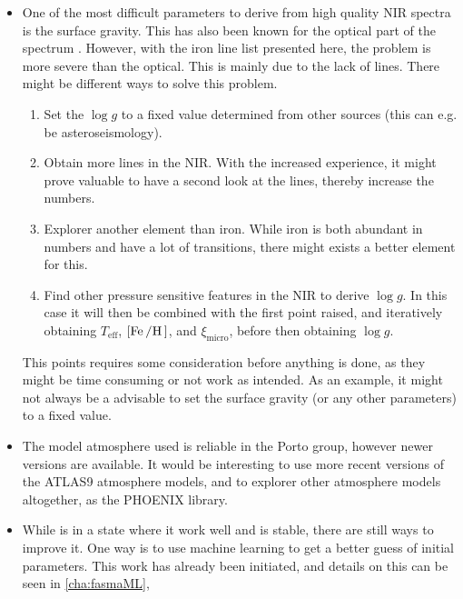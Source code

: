 \begin{itemize}
  \item One of the most difficult parameters to derive from high quality NIR spectra is the surface
        gravity. This has also been known for the optical part of the spectrum
        \citep[see e.g.][]{Mortier2014}. However, with the iron line list presented here, the
        problem is more severe than the optical. This is mainly due to the lack of 
        lines. There might be different ways to solve this problem.
        \begin{enumerate}
          \item Set the $\log g$ to a fixed value determined from other sources (this can e.g. be
                asteroseismology).
          \item Obtain more  lines in the NIR. With the increased experience, it might
                prove valuable to have a second look at the  lines, thereby increase the
                numbers.
          \item Explorer another element than iron. While iron is both abundant in numbers and have
                a lot of transitions, there might exists a better element for this.
          \item Find other pressure sensitive features in the NIR to derive $\log g$. In this case
                it will then be combined with the first point raised, and iteratively obtaining
                $T_\mathrm{eff}$, $[\ion{Fe}/\ion{H}]$, and $\xi_\mathrm{micro}$, before then
                obtaining $\log g$.
        \end{enumerate}
        This points requires some consideration before anything is done, as they might be time
        consuming or not work as intended. As an example, it might not always be a advisable to
        set the surface gravity (or any other parameters) to a fixed value.
  \item The model atmosphere used is reliable in the Porto group, however newer versions are
        available. It would be interesting to use more recent versions of the ATLAS9 atmosphere
        models, and to explorer other atmosphere models altogether, as the PHOENIX library.
  \item While  is in a state where it work well and is stable, there are still ways to
        improve it. One way is to use machine learning to get a better guess of initial parameters.
        This work has already been initiated, and details on this can be seen in \cref{cha:fasmaML},

\end{itemize}
